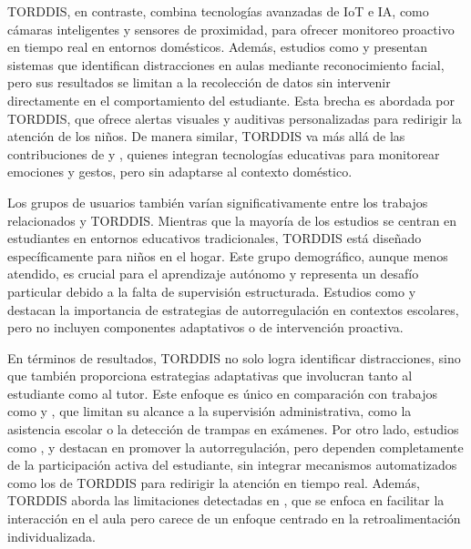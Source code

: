 \documentclass[a4paper,fleqn]{cas-sc}
\begin{document}
		TORDDIS, en contraste, combina tecnologías avanzadas de IoT e IA, como cámaras inteligentes y sensores de proximidad, para ofrecer monitoreo proactivo en tiempo real en entornos domésticos. Además, estudios como \cite{Nguyen2019} y \cite{Erazo2016Easing} presentan sistemas que identifican distracciones en aulas mediante reconocimiento facial, pero sus resultados se limitan a la recolección de datos sin intervenir directamente en el comportamiento del estudiante. Esta brecha es abordada por TORDDIS, que ofrece alertas visuales y auditivas personalizadas para redirigir la atención de los niños. De manera similar, TORDDIS va más allá de las contribuciones de \cite{Ozdamli2022} y \cite{VilliersRader2021}, quienes integran tecnologías educativas para monitorear emociones y gestos, pero sin adaptarse al contexto doméstico.
		
		Los grupos de usuarios también varían significativamente entre los trabajos relacionados y TORDDIS. Mientras que la mayoría de los estudios se centran en estudiantes en entornos educativos tradicionales, TORDDIS está diseñado específicamente para niños en el hogar. Este grupo demográfico, aunque menos atendido, es crucial para el aprendizaje autónomo y representa un desafío particular debido a la falta de supervisión estructurada. Estudios como \cite{Roberts2020Task} y \cite{Muljana2022Instructional} destacan la importancia de estrategias de autorregulación en contextos escolares, pero no incluyen componentes adaptativos o de intervención proactiva.
		
		En términos de resultados, TORDDIS no solo logra identificar distracciones, sino que también proporciona estrategias adaptativas que involucran tanto al estudiante como al tutor. Este enfoque es único en comparación con trabajos como \cite{James2019} y \cite{Ozdamli2022}, que limitan su alcance a la supervisión administrativa, como la asistencia escolar o la detección de trampas en exámenes. Por otro lado, estudios como \cite{Palmer2022impact}, \cite{Muljana2022Instructional} y \cite{Hartley2022Smartphone} destacan en promover la autorregulación, pero dependen completamente de la participación activa del estudiante, sin integrar mecanismos automatizados como los de TORDDIS para redirigir la atención en tiempo real. Además, TORDDIS aborda las limitaciones detectadas en \cite{Erazo2016Easing}, que se enfoca en facilitar la interacción en el aula pero carece de un enfoque centrado en la retroalimentación individualizada.
		
\end{document}
